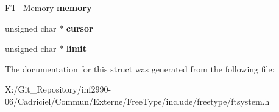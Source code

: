 \begin{DoxyCompactItemize}
\item 
\hypertarget{struct_f_t___stream_rec___a51e2be0d80d70b532aae3face5461e7e}{F\-T\-\_\-\-Memory {\bfseries memory}}\label{struct_f_t___stream_rec___a51e2be0d80d70b532aae3face5461e7e}

\item 
\hypertarget{struct_f_t___stream_rec___ab7dbbad87d8b6d0178771a06e1ce8b4d}{unsigned char $\ast$ {\bfseries cursor}}\label{struct_f_t___stream_rec___ab7dbbad87d8b6d0178771a06e1ce8b4d}

\item 
\hypertarget{struct_f_t___stream_rec___aff006e6ee3bbc2741a2c4ae79b1bad3a}{unsigned char $\ast$ {\bfseries limit}}\label{struct_f_t___stream_rec___aff006e6ee3bbc2741a2c4ae79b1bad3a}

\end{DoxyCompactItemize}


The documentation for this struct was generated from the following file\-:\begin{DoxyCompactItemize}
\item 
X\-:/\-Git\-\_\-\-Repository/inf2990-\/06/\-Cadriciel/\-Commun/\-Externe/\-Free\-Type/include/freetype/ftsystem.\-h\end{DoxyCompactItemize}
